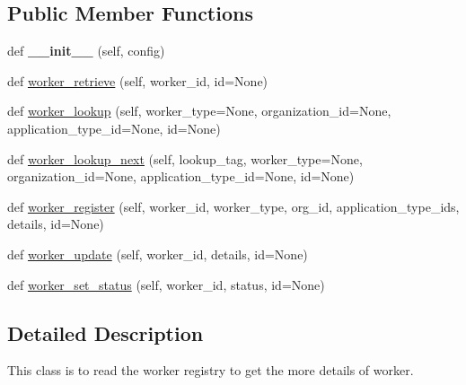 \subsection*{Public Member Functions}
\begin{DoxyCompactItemize}
\item 
\mbox{\label{classavalon__sdk_1_1connector_1_1direct_1_1jrpc_1_1jrpc__worker__registry_1_1JRPCWorkerRegistryImpl_a338f928bec9b437e1e7780ef63f1958e}} 
def {\bfseries \+\_\+\+\_\+init\+\_\+\+\_\+} (self, config)
\item 
def \hyperlink{classavalon__sdk_1_1connector_1_1direct_1_1jrpc_1_1jrpc__worker__registry_1_1JRPCWorkerRegistryImpl_a0d4da599b7d82da348588c43f6ca7a38}{worker\+\_\+retrieve} (self, worker\+\_\+id, id=None)
\item 
def \hyperlink{classavalon__sdk_1_1connector_1_1direct_1_1jrpc_1_1jrpc__worker__registry_1_1JRPCWorkerRegistryImpl_a1c7bfc463b630146653a3fb6708d7007}{worker\+\_\+lookup} (self, worker\+\_\+type=None, organization\+\_\+id=None, application\+\_\+type\+\_\+id=None, id=None)
\item 
def \hyperlink{classavalon__sdk_1_1connector_1_1direct_1_1jrpc_1_1jrpc__worker__registry_1_1JRPCWorkerRegistryImpl_ac23634a6538293c637296acfa9561f07}{worker\+\_\+lookup\+\_\+next} (self, lookup\+\_\+tag, worker\+\_\+type=None, organization\+\_\+id=None, application\+\_\+type\+\_\+id=None, id=None)
\item 
def \hyperlink{classavalon__sdk_1_1connector_1_1direct_1_1jrpc_1_1jrpc__worker__registry_1_1JRPCWorkerRegistryImpl_aefb2c49948e048e5eb4dee5c86818d46}{worker\+\_\+register} (self, worker\+\_\+id, worker\+\_\+type, org\+\_\+id, application\+\_\+type\+\_\+ids, details, id=None)
\item 
def \hyperlink{classavalon__sdk_1_1connector_1_1direct_1_1jrpc_1_1jrpc__worker__registry_1_1JRPCWorkerRegistryImpl_a55928c62f7c9cbd0aac937a39ac434a4}{worker\+\_\+update} (self, worker\+\_\+id, details, id=None)
\item 
def \hyperlink{classavalon__sdk_1_1connector_1_1direct_1_1jrpc_1_1jrpc__worker__registry_1_1JRPCWorkerRegistryImpl_ae0d2776c8b2a31619bbc64009aee2028}{worker\+\_\+set\+\_\+status} (self, worker\+\_\+id, status, id=None)
\end{DoxyCompactItemize}


\subsection{Detailed Description}
\begin{DoxyVerb}This class is to read the worker registry to get the more details
of worker.
\end{DoxyVerb}
 

